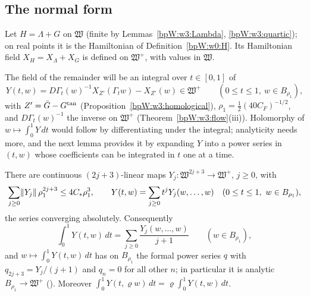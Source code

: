 \subsection{The normal form}\label{bpW:w3:main-sec}

Let $H=\Lambda+G$ on $\mathfrak W$ (finite by Lemmas~\ref{bpW:w3:Lambda}, \ref{bpW:w3:quartic}); on real points it
is the Hamiltonian of Definition~\ref{bpW:w0:H}. Its Hamiltonian field $X_H=X_\Lambda+X_G$ is defined on
$\mathfrak W^+$, with values in $\mathfrak W$.

The field of the remainder will be an integral over $t\in[0,1]$ of
\begin{equation}\label{bpW:w3:Ydef}
Y(t,w)=D\Gamma_t(w)^{-1}X_{Z'}(\Gamma_tw)-X_{Z'}(w)\in\mathfrak W^+\qquad(0\le t\le1,\ w\in B_{\rho_1}),
\end{equation}
with $Z'=\bar G-G^{\rm tan}$ (Proposition~\ref{bpW:w3:homological}), $\rho_1=\frac12(40C_F)^{-1/2}$, and $D\Gamma_t(w)^{-1}$
the inverse on $\mathfrak W^+$ (Theorem~\ref{bpW:w3:flow}(iii)). Holomorphy of $w\mapsto\int_0^1Y\,dt$ would follow by
differentiating under the integral; analyticity needs more, and the next lemma provides it by expanding $Y$ into a
power series in $(t,w)$ whose coefficients can be integrated in $t$ one at a time.

\begin{lemma}\label{bpW:w3:Yseries}
There are continuous $(2j+3)$-linear maps $Y_j:\mathfrak W^{2j+3}\to\mathfrak W^+$, $j\ge0$, with
\[\sum_{j\ge0}\lVert Y_j\rVert\,\rho_1^{2j+3}\le4C_*\rho_1^3,\qquad Y(t,w)=\sum_{j\ge0}t^jY_j(w,\dots,w)\quad(0\le t\le1,\ w\in B_{\rho_1}),\]
the series converging absolutely. Consequently
\[\int_0^1Y(t,w)\,dt=\sum_{j\ge0}\frac{Y_j(w,\dots,w)}{j+1}\qquad(w\in B_{\rho_1}),\]
and $w\mapsto\int_0^1Y(t,w)\,dt$ has on $B_{\rho_1}$ the formal power series $q$ with $q_{2j+3}=Y_j/(j+1)$ and $q_n=0$ for
all other $n$; in particular it is analytic $B_{\rho_1}\to\mathfrak W^+$ (). Moreover
$\int_0^1Y(t,\varrho w)\,dt=\varrho\int_0^1Y(t,w)\,dt$.
\end{lemma}

